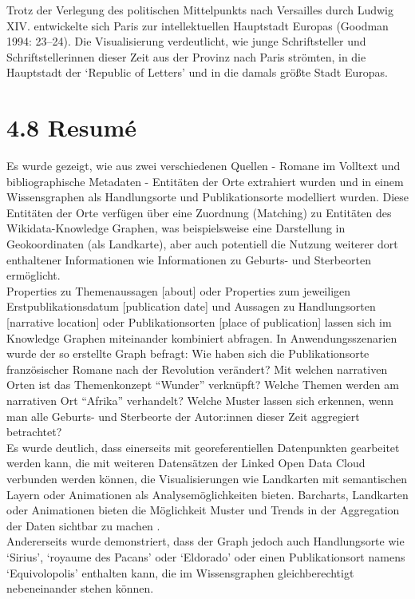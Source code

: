 \documentclass[
  12pt,
  letterpaper,
  DIV=11,
  numbers=noendperiod]{scrreprt}
\begin{document}
Trotz der Verlegung des politischen Mittelpunkts nach Versailles durch
Ludwig XIV. entwickelte sich Paris zur intellektuellen Hauptstadt
Europas (Goodman 1994: 23--24). Die Visualisierung verdeutlicht, wie
junge Schriftsteller und Schriftstellerinnen dieser Zeit aus der Provinz
nach Paris strömten, in die Hauptstadt der `Republic of Letters' und in
die damals größte Stadt Europas.

\section{4.8 Resumé}\label{resumuxe9}

Es wurde gezeigt, wie aus zwei verschiedenen Quellen - Romane im
Volltext und bibliographische Metadaten - Entitäten der Orte extrahiert
wurden und in einem Wissensgraphen als Handlungsorte und
Publikationsorte modelliert wurden. Diese Entitäten der Orte verfügen
über eine Zuordnung (Matching) zu Entitäten des Wikidata-Knowledge
Graphen, was beispielsweise eine Darstellung in Geokoordinaten (als
Landkarte), aber auch potentiell die Nutzung weiterer dort enthaltener
Informationen wie Informationen zu Geburts- und Sterbeorten
ermöglicht.\\
Properties zu Themenaussagen {[}about{]} oder Properties zum jeweiligen
Erstpublikationsdatum {[}publication date{]} und Aussagen zu
Handlungsorten {[}narrative location{]} oder Publikationsorten {[}place
of publication{]} lassen sich im Knowledge Graphen miteinander
kombiniert abfragen. In Anwendungsszenarien wurde der so erstellte Graph
befragt: Wie haben sich die Publikationsorte französischer Romane nach
der Revolution verändert? Mit welchen narrativen Orten ist das
Themenkonzept ``Wunder'' verknüpft? Welche Themen werden am narrativen
Ort ``Afrika'' verhandelt? Welche Muster lassen sich erkennen, wenn man
alle Geburts- und Sterbeorte der Autor:innen dieser Zeit aggregiert
betrachtet?\\
Es wurde deutlich, dass einerseits mit georeferentiellen Datenpunkten
gearbeitet werden kann, die mit weiteren Datensätzen der Linked Open
Data Cloud verbunden werden können, die Visualisierungen wie Landkarten
mit semantischen Layern oder Animationen als Analysemöglichkeiten
bieten. Barcharts, Landkarten oder Animationen bieten die Möglichkeit
Muster und Trends in der Aggregation der Daten sichtbar zu machen .\\
Andererseits wurde demonstriert, dass der Graph jedoch auch
Handlungsorte wie `Sirius', `royaume des Pacans' oder `Eldorado' oder
einen Publikationsort namens `Equivolopolis' enthalten kann, die im
Wissensgraphen gleichberechtigt nebeneinander stehen können.
\end{document}
